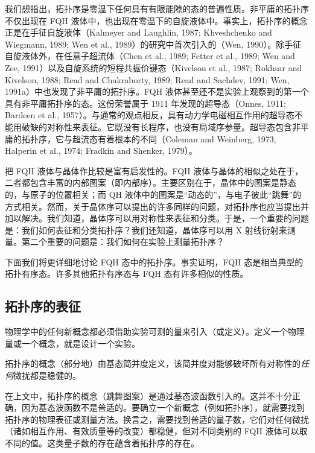 我们想指出，拓扑序是零温下任何具有有限能隙的态的普遍性质。非平庸的拓扑序不仅出现在 FQH 液体中，也出现在零温下的自旋液体中。事实上，拓扑序的概念正是在手征自旋液体（Kalmeyer and Laughlin, 1987; Khveshchenko and Wiegmann, 1989; Wen et al., 1989）的研究中首次引入的（Wen, 1990）。除手征自旋液体外，在任意子超流体（Chen et al., 1989; Fetter et al., 1989; Wen and Zee, 1991）以及自旋系统的短程共振价键态（Kivelson et al., 1987; Rokhsar and Kivelson, 1988; Read and Chakraborty, 1989; Read and Sachdev, 1991; Wen, 1991a）中也发现了非平庸的拓扑序。FQH 液体甚至还不是实验上观察到的第一个具有非平庸拓扑序的态。这份荣誉属于 1911 年发现的超导态（Onnes, 1911; Bardeen et al., 1957）。与通常的观点相反，具有动力学电磁相互作用的超导态不能用破缺的对称性来表征。它既没有长程序，也没有局域序参量。超导态包含非平庸的拓扑序，它与超流态有着根本的不同（Coleman and Weinberg, 1973; Halperin et al., 1974; Fradkin and Shenker, 1979）。

把 FQH 液体与晶体作比较是富有启发性的。FQH 液体与晶体的相似之处在于，二者都包含丰富的内部图案（即内部序）。主要区别在于，晶体中的图案是静态的，与原子的位置相关；而 QH 液体中的图案是“动态的”，与电子彼此“跳舞”的方式相关。然而，关于晶体序可以提出的许多同样的问题，对拓扑序也应当提出并加以解决。我们知道，晶体序可以用对称性来表征和分类。于是，一个重要的问题是：我们如何表征和分类拓扑序？我们还知道，晶体序可以用 X 射线衍射来测量。第二个重要的问题是：我们如何在实验上测量拓扑序？

下面我们将更详细地讨论 FQH 态中的拓扑序。事实证明，FQH 态是相当典型的拓扑有序态。许多其他拓扑有序态与 FQH 态有许多相似的性质。

\subsection{拓扑序的表征}

\begin{keypoints}
\item 物理学中的任何新概念都必须借助实验可测的量来引入（或定义）。定义一个物理量或一个概念，就是设计一个实验。
\item 拓扑序的概念（部分地）由基态简并度定义，该简并度对能够破坏所有对称性的\emph{任何}微扰都是稳健的。
\end{keypoints}

在上文中，拓扑序的概念（跳舞图案）是通过基态波函数引入的。这并不十分正确，因为基态波函数不是普适的。要确立一个新概念（例如拓扑序），就需要找到拓扑序的物理表征或测量方法。换言之，需要找到普适的量子数，它们对任何微扰（诸如相互作用、有效质量等的改变）都稳健，但对不同类别的 FQH 液体可以取不同的值。这类量子数的存在蕴含着拓扑序的存在。

